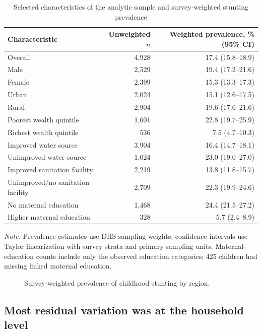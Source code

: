 \documentclass[11pt]{article}
\begin{document}
\begin{table}[H]
\centering
\caption{Selected characteristics of the analytic sample and survey-weighted stunting prevalence}
\label{tab:selected_descriptive}
\begin{tabular}{lrr}
\toprule
Characteristic & Unweighted $n$ & Weighted prevalence, \% (95\% CI) \\
\midrule
Overall & 4,928 & 17.4 (15.8--18.9) \\
Male & 2,529 & 19.4 (17.2--21.6) \\
Female & 2,399 & 15.3 (13.3--17.3) \\
Urban & 2,024 & 15.1 (12.6--17.5) \\
Rural & 2,904 & 19.6 (17.6--21.6) \\
Poorest wealth quintile & 1,601 & 22.8 (19.7--25.9) \\
Richest wealth quintile & 536 & 7.5 (4.7--10.3) \\
Improved water source & 3,904 & 16.4 (14.7--18.1) \\
Unimproved water source & 1,024 & 23.0 (19.0--27.0) \\
Improved sanitation facility & 2,219 & 13.8 (11.8--15.7) \\
Unimproved/no sanitation facility & 2,709 & 22.3 (19.9--24.6) \\
No maternal education & 1,468 & 24.4 (21.5--27.2) \\
Higher maternal education & 328 & 5.7 (2.4--8.9) \\
\bottomrule
\end{tabular}

\begin{minipage}{0.95\textwidth}
\footnotesize
\textit{Note.} Prevalence estimates use DHS sampling weights; confidence intervals use Taylor linearization with survey strata and primary sampling units. Maternal-education counts include only the observed education categories; 425 children had missing linked maternal education.
\end{minipage}
\end{table}

\begin{figure}[H]
\centering

\caption{Survey-weighted prevalence of childhood stunting by region.}
\end{figure}

\subsection{Most residual variation was at the household level}
\end{document}
